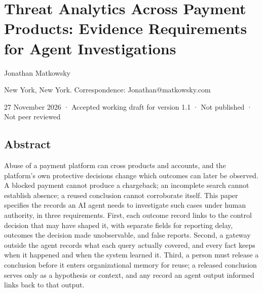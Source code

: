 \documentclass[
  11pt,
]{article}
\author{}
\date{}
\begin{document}
\FloatBarrier

\begingroup\raggedright{}

\hypertarget{threat-analytics-across-payment-products-evidence-requirements-for-agent-investigations}{%
\section{Threat Analytics Across Payment Products: Evidence Requirements
for Agent
Investigations}\label{threat-analytics-across-payment-products-evidence-requirements-for-agent-investigations}}

\endgroup

\suppressfloats[t]

Jonathan Matkowsky

New York, New York. Correspondence: Jonathan@matkowsky.com

27 November 2026 · Accepted working draft for version 1.1 · Not
published · Not peer reviewed

\FloatBarrier

\hypertarget{abstract}{%
\subsection{Abstract}\label{abstract}}

\suppressfloats[t]

Abuse of a payment platform can cross products and accounts, and the
platform's own protective decisions change which outcomes can later be
observed. A blocked payment cannot produce a chargeback; an incomplete
search cannot establish absence; a reused conclusion cannot corroborate
itself. This paper specifies the records an AI agent needs to
investigate such cases under human authority, in three requirements.
First, each outcome record links to the control decision that may have
shaped it, with separate fields for reporting delay, outcomes the
decision made unobservable, and false reports. Second, a gateway outside
the agent records what each query actually covered, and every fact keeps
when it happened and when the system learned it. Third, a person must
release a conclusion before it enters organizational memory for reuse; a
released conclusion serves only as a hypothesis or context, and any
record an agent output informed links back to that output.
\end{document}
